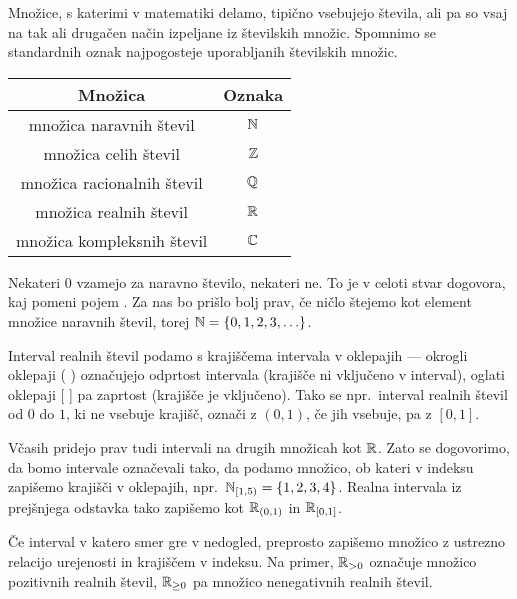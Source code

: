 Množice, s katerimi v matematiki delamo, tipično vsebujejo števila, ali pa so vsaj na tak ali drugačen način izpeljane iz številskih množic. Spomnimo se standardnih oznak najpogosteje uporabljanih številskih množic.
\begin{center}
\begin{tabular}{|cc|}
\hline
\textbf{Množica} & \textbf{Oznaka} \\
\hline
množica naravnih števil & $\mathbb{N}$ \\
množica celih števil & $\mathbb{Z}$ \\
množica racionalnih števil & $\mathbb{Q}$ \\
množica realnih števil & $\mathbb{R}$ \\
množica kompleksnih števil & $\mathbb{C}$ \\
\hline
\end{tabular}
\end{center}

Nekateri $0$ vzamejo za naravno število, nekateri ne. To je v celoti stvar dogovora, kaj pomeni pojem . Za nas bo prišlo bolj prav, če ničlo štejemo kot element množice naravnih števil, torej $\NN = \set{0, 1, 2, 3, \ldots}$.

Interval realnih števil podamo s krajiščema intervala v oklepajih --- okrogli oklepaji ( ) označujejo odprtost intervala (krajišče ni vključeno v interval), oglati oklepaji [ ] pa zaprtost (krajišče je vključeno). Tako se npr.~interval realnih števil od $0$ do $1$, ki ne vsebuje krajišč, označi z $(0, 1)$, če jih vsebuje, pa z $[0, 1]$.

Včasih pridejo prav tudi intervali na drugih množicah kot $\mathbb{R}$. Zato se dogovorimo, da bomo intervale označevali tako, da podamo množico, ob kateri v indeksu zapišemo krajišči v oklepajih, npr.~$\intco[\NN]{1}{5} = \set{1, 2, 3, 4}$. Realna intervala iz prejšnjega odstavka tako zapišemo kot ${\mathbb{R}}_{(0, 1)}$ in ${\mathbb{R}}_{[0, 1]}$.

Če interval v katero smer gre v nedogled, preprosto zapišemo množico z ustrezno relacijo urejenosti in krajiščem v indeksu. Na primer, $\mathbb{R}_{> 0}$ označuje množico pozitivnih realnih števil, $\mathbb{R}_{\geq 0}$ pa množico nenegativnih realnih števil.


